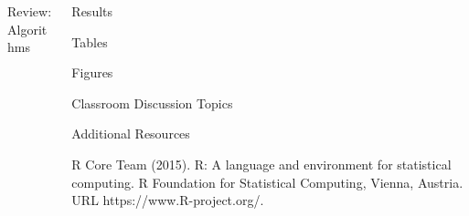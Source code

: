 \documentclass[final]{beamer}
\newlength{\onecolwid}
\theoremstyle{definition}
\begin{document}
\begin{frame}[t]
\begin{columns}[t]
\begin{column}{\onecolwid}
\begin{alertblock}{Review: Algorithms}
\end{alertblock}
\end{column}
\begin{column}{\onecolwid} %
\begin{alertblock}{Results}
\end{alertblock}
\begin{alertblock}{Tables}
\end{alertblock}
\begin{alertblock}{Figures}
\end{alertblock}
\begin{alertblock}{Classroom Discussion Topics}
\end{alertblock}
\begin{alertblock}{Additional Resources}
\begin{enumerate}
\end{enumerate}
\end{alertblock}

\begin{thebibliography}{00}
\footnotesize		 		
{}R Core Team (2015). 
\newblock R: A language and environment for statistical computing. R Foundation for Statistical Computing, Vienna, Austria.
\newblock URL https://www.R-project.org/.		
\end{thebibliography}
\end{column}
\end{columns}
\end{frame}
\end{document}
